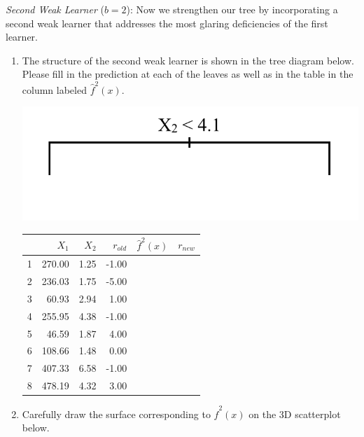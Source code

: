 \documentclass{article}\usepackage[]{graphicx}\usepackage[]{color}
\begin{document}
\emph{Second Weak Learner} ($b = 2$): Now we strengthen our tree by incorporating a second weak learner that addresses the most glaring deficiencies of the first learner.

\begin{enumerate}
\item The structure of the second weak learner is shown in the tree diagram below. Please fill in the prediction at each of the leaves as well as in the table in the column labeled $\hat{f}^2(x)$.

\vspace{10mm}

\begin{minipage}[t]{.4\textwidth}
{\includegraphics[width=\textwidth]{treeB.png}}
\end{minipage}
\hfill
\begin{minipage}[t]{.4\textwidth}
\begin{tabular}{rrrrll}
  \hline
 & $X_1$ & $X_2$ & $r_{old}$ & $\hat{f}^2(x)$ & $r_{new}$ \\ 
  \hline
1 & 270.00 & 1.25 & -1.00 &  &  \\ 
  2 & 236.03 & 1.75 & -5.00 &  &  \\ 
  3 & 60.93 & 2.94 & 1.00 &  &  \\ 
  4 & 255.95 & 4.38 & -1.00 &  &  \\ 
  5 & 46.59 & 1.87 & 4.00 &  &  \\ 
  6 & 108.66 & 1.48 & 0.00 &  &  \\ 
  7 & 407.33 & 6.58 & -1.00 &  &  \\ 
  8 & 478.19 & 4.32 & 3.00 &  &  \\ 
   \hline
\end{tabular}

\end{minipage}

\vspace{8mm}
\item Carefully draw the surface corresponding to $\hat{f}^2(x)$ on the 3D scatterplot below.


\end{enumerate}
\end{document}
